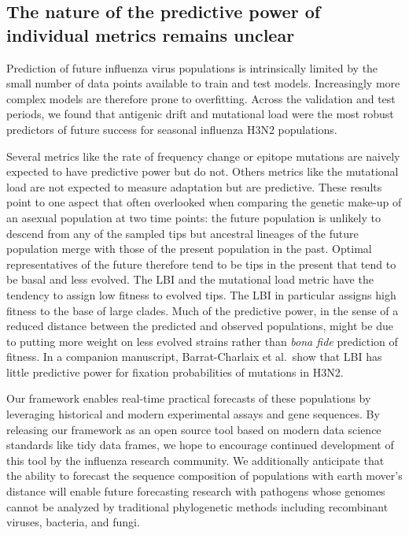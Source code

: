 \subsection*{The nature of the predictive power of individual metrics remains unclear}

Prediction of future influenza virus populations is intrinsically limited by the small number of data points available to train and test models.
Increasingly more complex models are therefore prone to overfitting.
Across the validation and test periods, we found that antigenic drift and mutational load were the most robust predictors of future success for seasonal influenza H3N2 populations.

Several metrics like the rate of frequency change or epitope mutations are naively expected to have predictive power but do not.
Others metrics like the mutational load are not expected to measure adaptation but are predictive.
These results point to one aspect that often overlooked when comparing the genetic make-up of an asexual population at two time points: the future population is unlikely to descend from any of the sampled tips but ancestral lineages of the future population merge with those of the present population in the past.
Optimal representatives of the future therefore tend to be tips in the present that tend to be basal and less evolved.
The LBI and the mutational load metric have the tendency to assign low fitness to evolved tips.
The LBI in particular assigns high fitness to the base of large clades.
Much of the predictive power, in the sense of a reduced distance between the predicted and observed populations, might be due to putting more weight on less evolved strains rather than \emph{bona fide} prediction of fitness.
In a companion manuscript, Barrat-Charlaix et al.~show that LBI has little predictive power for fixation probabilities of mutations in H3N2.

Our framework enables real-time practical forecasts of these populations by leveraging historical and modern experimental assays and gene sequences.
By releasing our framework as an open source tool based on modern data science standards like tidy data frames, we hope to encourage continued development of this tool by the influenza research community.
We additionally anticipate that the ability to forecast the sequence composition of populations with earth mover's distance will enable future forecasting research with pathogens whose genomes cannot be analyzed by traditional phylogenetic methods including recombinant viruses, bacteria, and fungi.

